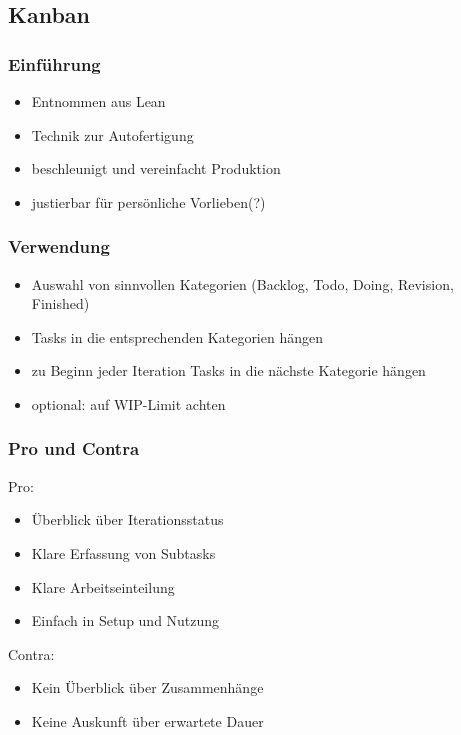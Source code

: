 \documentclass[%
	handout
]{beamer}
\begin{document}
	\subsection{Kanban}
		\begin{frame}
			\frametitle{Einführung}
			\begin{itemize}
				\item Entnommen aus Lean
				\item Technik zur Autofertigung
				\item beschleunigt und vereinfacht Produktion
				\item justierbar für persönliche Vorlieben(?)
			\end{itemize}
		\end{frame}
		
		\begin{frame}
			\frametitle{Verwendung}
			\begin{itemize}
				\item Auswahl von sinnvollen Kategorien (Backlog, Todo, Doing, Revision, Finished)
				\item Tasks in die entsprechenden Kategorien hängen
				\item zu Beginn jeder Iteration Tasks in die nächste Kategorie hängen
				\item optional: auf WIP-Limit achten
			\end{itemize}
		\end{frame}
		
		\begin{frame}
			\frametitle{Pro und Contra}
			\begin{minipage}[t]{.48\textwidth}
				Pro:
				\begin{itemize}
					\item Überblick über Iterationsstatus
					\item Klare Erfassung von Subtasks
					\item Klare Arbeitseinteilung
					\item Einfach in Setup und Nutzung
				\end{itemize}
			\end{minipage}
			\pause
			\begin{minipage}[t]{.48\textwidth}
				Contra:
				\begin{itemize}
					\item Kein Überblick über Zusammenhänge
					\item Keine Auskunft über erwartete Dauer
				\end{itemize}
			\end{minipage}
		\end{frame}
		
\end{document}
